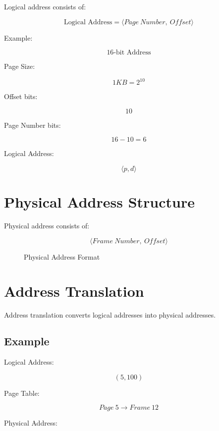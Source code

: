 Logical address consists of:

\[
\text{Logical Address} =
\langle Page\ Number,\ Offset \rangle
\]

Example:

\[
16\text{-bit Address}
\]

Page Size:

\[
1KB = 2^{10}
\]

Offset bits:

\[
10
\]

Page Number bits:

\[
16-10 = 6
\]

Logical Address:

\[
\langle p,d \rangle
\]

\section{Physical Address Structure}

Physical address consists of:

\[
\langle Frame\ Number,\ Offset \rangle
\]

\begin{figure}[H]
\centering
{}
\caption{Physical Address Format}
\end{figure}

\section{Address Translation}

Address translation converts logical addresses into physical addresses.

\subsection{Example}

Logical Address:

\[
(5,100)
\]

Page Table:

\[
Page\ 5 \rightarrow Frame\ 12
\]

Physical Address:

